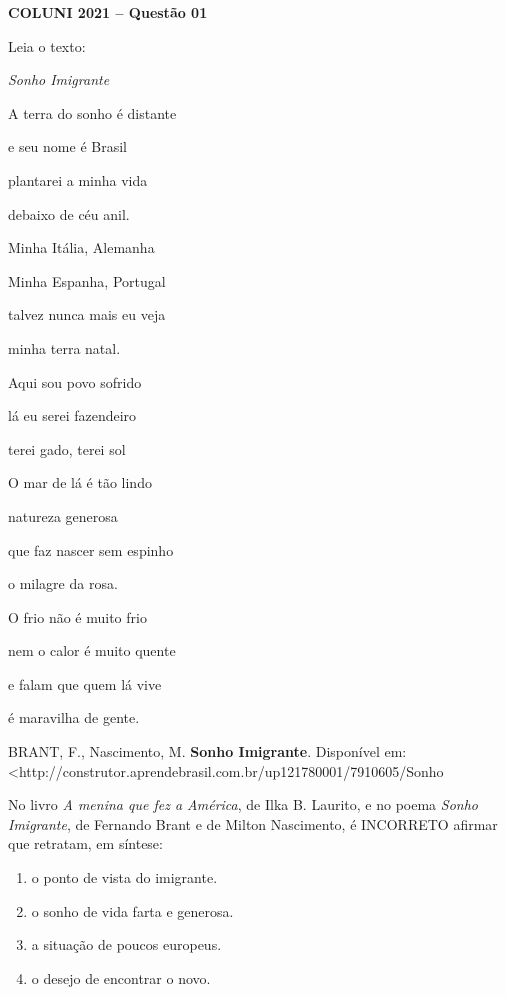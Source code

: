 \textbf{COLUNI 2021 -- Questão 01}\par\medskip Leia o texto:

\begin{center}
\textit{Sonho Imigrante}

A terra do sonho é distante

e seu nome é Brasil

plantarei a minha vida

debaixo de céu anil.

Minha Itália, Alemanha

Minha Espanha, Portugal

talvez nunca mais eu veja

minha terra natal.

Aqui sou povo sofrido

lá eu serei fazendeiro

terei gado, terei sol

O mar de lá é tão lindo

natureza generosa

que faz nascer sem espinho

o milagre da rosa.

O frio não é muito frio

nem o calor é muito quente

e falam que quem lá vive

é maravilha de gente.
\end{center}

BRANT, F., Nascimento, M. \textbf{Sonho Imigrante}. Disponível em: <http://construtor.aprendebrasil.com.br/up121780001/7910605/Sonho%

\par

No livro \textit{A menina que fez a América}, de Ilka B. Laurito, e no poema \textit{Sonho Imigrante}, de Fernando Brant e de Milton Nascimento, é INCORRETO afirmar que retratam, em síntese:
\begin{enumerate}
\item o ponto de vista do imigrante.
\item o sonho de vida farta e generosa.
\item a situação de poucos europeus.
\item o desejo de encontrar o novo.
\end{enumerate}
